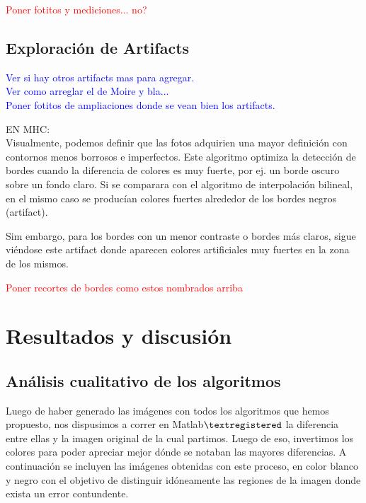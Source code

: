 \documentclass[a4paper]{article}
\begin{document}
\textcolor{red}{Poner fotitos y mediciones... no?}\\


\newpage
\subsection{Exploraci\'on de Artifacts}

\textcolor{blue}{Ver si hay otros artifacts mas para agregar.\\
Ver como arreglar el de Moire y bla...\\
Poner fotitos de ampliaciones donde se vean bien los artifacts.}

EN MHC:\\

Visualmente, podemos definir que las fotos adquirien una mayor definici\'on con contornos menos borrosos e imperfectos. Este algoritmo optimiza la detecci\'on de bordes cuando la diferencia de colores es muy fuerte, por ej. un borde oscuro sobre un fondo claro. Si se comparara con el algoritmo de interpolaci\'on bilineal, en el mismo caso se produc\'ian colores fuertes alrededor de los bordes negros (artifact).

Sim embargo, para los bordes con un menor contraste o bordes m\'as claros, sigue vi\'endose este artifact donde aparecen colores artificiales muy fuertes en la zona de los mismos.

\textcolor{red}{Poner recortes de bordes como estos nombrados arriba}




\newpage
\section{Resultados y discusi\'on}


\subsection{An\'alisis cualitativo de los algoritmos}
Luego de haber generado las im\'agenes con todos los algoritmos que hemos propuesto, nos dispusimos a correr en Matlab$\textregistered$  la diferencia entre ellas y la imagen original de la cual partimos. Luego de eso, invertimos los colores para poder apreciar mejor d\'onde se notaban las mayores diferencias. A continuaci\'on se incluyen las im\'agenes obtenidas con este proceso, en color blanco y negro con el objetivo de distinguir id\'oneamente las regiones de la imagen donde exista un error contundente.\\
\end{document}
